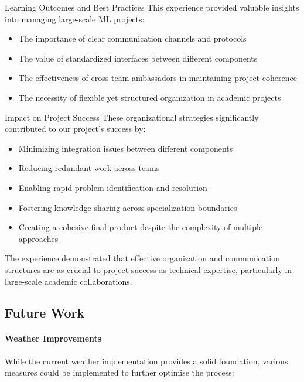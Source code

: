 \documentclass[a4paper]{article}
\providecommand{\tightlist}{%
      \setlength{\itemsep}{0pt}\setlength{\parskip}{0pt}}
\begin{document}
Learning Outcomes and Best Practices This experience provided valuable
insights into managing large-scale ML projects:

\begin{itemize}
\tightlist
\item
  The importance of clear communication channels and protocols
\item
  The value of standardized interfaces between different components
\item
  The effectiveness of cross-team ambassadors in maintaining project
  coherence
\item
  The necessity of flexible yet structured organization in academic
  projects
\end{itemize}

Impact on Project Success These organizational strategies significantly
contributed to our project's success by:

\begin{itemize}
\tightlist
\item
  Minimizing integration issues between different components
\item
  Reducing redundant work across teams
\item
  Enabling rapid problem identification and resolution
\item
  Fostering knowledge sharing across specialization boundaries
\item
  Creating a cohesive final product despite the complexity of multiple
  approaches
\end{itemize}

The experience demonstrated that effective organization and
communication structures are as crucial to project success as technical
expertise, particularly in large-scale academic collaborations.

    \subsection{Future Work}\label{future-work}

\paragraph{Weather Improvements}\label{weather-improvements}

While the current weather implementation provides a solid foundation,
various measures could be implemented to further optimise the process:
\end{document}
